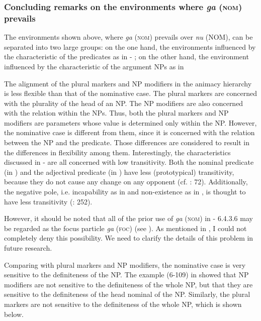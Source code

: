 \subsubsection{Concluding remarks on the environments where \textit{ga} (\textsc{nom}) prevails}

The environments shown above, where \textit{ga} (\textsc{nom}) prevails over \textit{nu} (NOM), can be separated into two large groups: on the one hand, the environments influenced by the characteristic of the predicates as in  - ; on the other hand, the environment influenced by the characteristic of the argument NPs as in 

The alignment of the plural markers and NP modifiers in the animacy hierarchy is less flexible than that of the nominative case. The plural markers are concerned with the plurality of the head of an NP. The NP modifiers are also concerned with the relation within the NPs. Thus, both the plural markers and NP modifiers are parameters whose value is determined only within the NP. However, the nominative case is different from them, since it is concerned with the relation between the NP and the predicate. Those differences are considered to result in the differences in flexibility among them. Interestingly, the characteristics discussed in  -  are all concerned with low transitivity. Both the nominal predicate (in ) and the adjectival predicate (in ) have less (prototypical) transitivity, because they do not cause any change on any opponent (cf. \citealt{Tsunoda1991}: 72). Additionally, the negative pole, i.e. incapability as in  and non-existence as in , is thought to have less transitivity (\citealt{HopperThompson1980}: 252).

However, it should be noted that all of the prior use of \textit{ga} (\textsc{nom}) in  - 6.4.3.6 may be regarded as the focus particle \textit{ga} (\textsc{foc}) (see ). As mentioned in , I could not completely deny this possibility. We need to clarify the details of this problem in future research.

Comparing with plural markers and NP modifiers, the nominative case is very sensitive to the definiteness of the NP. The example (6-109) in  showed that NP modifiers are not sensitive to the definiteness of the whole NP, but that they are sensitive to the definiteness of the head nominal of the NP. Similarly, the plural markers are not sensitive to the definiteness of the whole NP, which is shown below.

